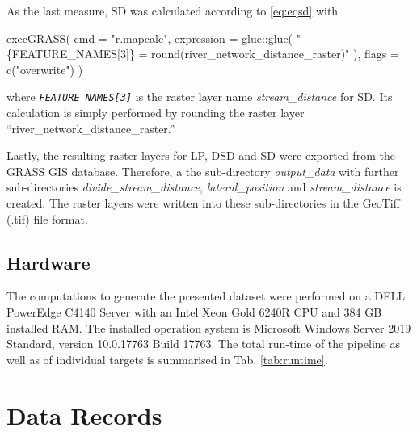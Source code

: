 \documentclass[fleqn,10pt]{wlscirep}
\newenvironment{Shaded}{\begin{snugshade}}{\end{snugshade}}
\newcommand{\AttributeTok}[1]{\textcolor[rgb]{0.77,0.63,0.00}{#1}}
\newcommand{\FunctionTok}[1]{\textcolor[rgb]{0.00,0.00,0.00}{#1}}
\newcommand{\NormalTok}[1]{#1}
\newcommand{\SpecialCharTok}[1]{\textcolor[rgb]{0.00,0.00,0.00}{#1}}
\newcommand{\StringTok}[1]{\textcolor[rgb]{0.31,0.60,0.02}{#1}}
\begin{document}
As the last measure, SD was calculated according to \eqref{eq:eqsd} with

\footnotesize

\begin{Shaded}
\begin{Highlighting}[]
\FunctionTok{execGRASS}\NormalTok{(}
  \AttributeTok{cmd =} \StringTok{"r.mapcalc"}\NormalTok{,}
  \AttributeTok{expression =}\NormalTok{ glue}\SpecialCharTok{::}\FunctionTok{glue}\NormalTok{(}
    \StringTok{"\{FEATURE\_NAMES[3]\} = round(river\_network\_distance\_raster)"}
\NormalTok{  ),}
  \AttributeTok{flags =} \FunctionTok{c}\NormalTok{(}\StringTok{"overwrite"}\NormalTok{)}
\NormalTok{)}
\end{Highlighting}
\end{Shaded}

\normalsize
\noindent
where \emph{\texttt{FEATURE\_NAMES{[}3{]}}} is the raster layer name \emph{stream\_distance} for SD. Its calculation is simply performed by rounding the raster layer ``river\_network\_distance\_raster.''

Lastly, the resulting raster layers for LP, DSD and SD were exported from the GRASS GIS database. Therefore, a the sub-directory \emph{output\_data} with further sub-directories \emph{divide\_stream\_distance}, \emph{lateral\_position} and \emph{stream\_distance} is created. The raster layers were written into these sub-directories in the GeoTiff (.tif) file format.

\hypertarget{hardware}{%
\subsection*{Hardware}\label{hardware}}

The computations to generate the presented dataset were performed on a DELL PowerEdge C4140 Server with an Intel Xeon Gold 6240R CPU and 384 GB installed RAM. The installed operation system is Microsoft Windows Server 2019 Standard, version 10.0.17763 Build 17763. The total run-time of the pipeline as well as of individual targets is summarised in Tab. \ref{tab:runtime}.

\hypertarget{data-records}{%
\section*{Data Records}\label{data-records}}
\end{document}
